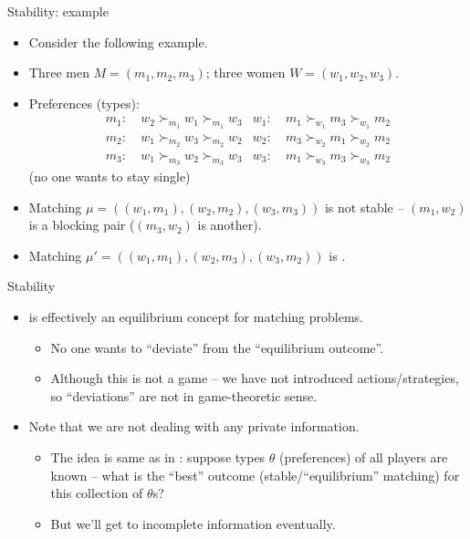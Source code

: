 \documentclass[english,10pt
,aspectratio=169
]{beamer}
\begin{document}
\begin{frame}{Stability: example}
\begin{example}
	\begin{itemize}
		\item Consider the following example.
		\item Three men $M = (m_1,m_2,m_3)$; three women $W = (w_1,w_2,w_3)$.
		\item Preferences (types):
		\begin{align*}
			m_1:& \ w_2 \succ_{m_1} w_1 \succ_{m_1} w_3 	& w_1:& \ m_1 \succ_{w_1} m_3 \succ_{w_1} m_2
			\\
			m_2:& \ w_1 \succ_{m_2} w_3 \succ_{m_2} w_2 	& w_2:& \ m_3 \succ_{w_2} m_1 \succ_{w_2} m_2
			\\
			m_3:& \ w_1 \succ_{m_3} w_2 \succ_{m_3} w_3 	& w_3:& \ m_1 \succ_{w_3} m_3 \succ_{w_3} m_2
		\end{align*}
		(no one wants to stay single)
		\item Matching $\mu = \left( (w_1,m_1), (w_2,m_2), (w_3,m_3) \right)$ is \alert{not stable} -- $(m_1,w_2)$ is a blocking pair ($(m_3,w_2)$ is another).
		\item Matching $\mu' = \left( (w_1,m_1), (w_2,m_3), (w_3,m_2) \right)$ is .
	\end{itemize}
\end{example}
\end{frame}


\begin{frame}{Stability}
\begin{itemize}
	\item {} is effectively an equilibrium concept for matching problems.
	\begin{itemize}
		\item No one wants to ``deviate'' from the ``equilibrium outcome''.
		\item Although this is not a game -- we have not introduced actions/strategies, so ``deviations'' are not in game-theoretic sense.
	\end{itemize}
	\item Note that we are not dealing with any \alert{private information}.
	\begin{itemize}
		\item The idea is same as in : suppose types $\theta$ (preferences) of all players are known -- what is the ``best'' outcome (stable/``equilibrium'' matching) for this collection of $\theta$s?
		\item But we'll get to incomplete information eventually.
	\end{itemize}
\end{itemize}
\end{frame}
\end{document}
